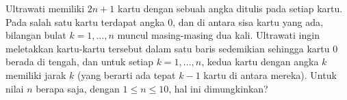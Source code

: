 \documentclass[11pt]{scrartcl}
\begin{document}
\begin{soaljawab}
    Ultrawati memiliki $2n + 1$ kartu dengan sebuah angka ditulis pada setiap kartu. Pada salah satu kartu terdapat angka 0, dan di antara sisa kartu yang ada, bilangan bulat $k = 1, \dots, n$ muncul masing-masing dua kali. Ultrawati ingin meletakkan kartu-kartu tersebut dalam satu baris sedemikian sehingga kartu 0 berada di tengah, dan untuk setiap $k = 1, ..., n$, kedua kartu dengan angka $k$ memiliki jarak $k$ (yang berarti ada tepat $k - 1$ kartu di antara mereka). Untuk nilai $n$ berapa saja, dengan $1 \le n \le 10$, hal ini dimungkinkan?
\end{soaljawab}
\end{document}
